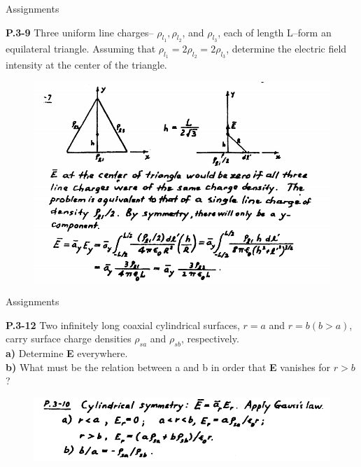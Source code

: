 \documentclass[xcolor={dvipsnames}]{beamer}
\begin{document}
\begin{frame}{Assignments}
\begin{block}{\textbf{P.3-9}}
Three uniform line charges-- $\rho_{l_1},\rho_{l_2}$, and $\rho_{l_3}$, each of length L--form an equilateral triangle. Assuming that $\rho_{l_1}=2\rho_{l_2}=2\rho_{l_3}$, determine the electric field intensity at the center of the triangle.
\end{block}
\pause
\begin{figure}[H]
	\centering
	\includegraphics[width=0.7\linewidth]{2_5.png}
\end{figure}
\end{frame}
\begin{frame}{Assignments}
\begin{block}{\textbf{P.3-12}}
Two infinitely long coaxial cylindrical surfaces, $r=a$ and $r=b (b>a)$, carry surface charge densities $\rho_{sa}$ and $\rho_{sb}$, respectively.\\
\textbf{a)} Determine \textbf{E} everywhere.\\
\textbf{b)} What must be the relation between a and b in order that \textbf{E} vanishes for $r>b$?
\end{block}
\pause
\begin{figure}[H]
	\centering
	\includegraphics[width=0.7\linewidth]{2_6.png}
\end{figure}
\end{frame}
\end{document}
